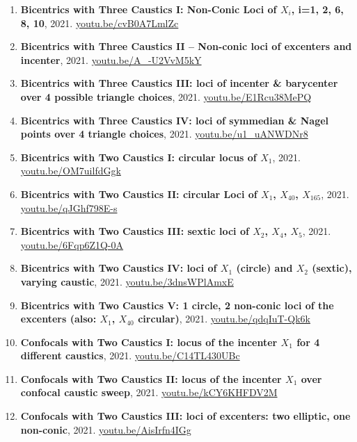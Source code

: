 \documentclass[12pt]{article}
\begin{document}
\begin{enumerate}[resume]
\item \textbf{Bicentrics with Three Caustics I: Non-Conic Loci of $X_i$, i=1, 2, 6, 8, 10}, 2021. \href{https://youtu.be/cvB0A7LmlZc}{\url{youtu.be/cvB0A7LmlZc}}
\item \textbf{Bicentrics with Three Caustics II -- Non-conic loci of excenters and  incenter}, 2021. \href{https://youtu.be/A_-U2VvM5kY}{\url{youtu.be/A\_-U2VvM5kY}}
\item \textbf{Bicentrics with Three Caustics III: loci of incenter \& barycenter over 4 possible triangle choices}, 2021. \href{https://youtu.be/E1Rcu38MePQ}{\url{youtu.be/E1Rcu38MePQ}}
\item \textbf{Bicentrics with Three Caustics IV: loci of symmedian \& Nagel points over 4 triangle choices}, 2021. \href{https://youtu.be/u1_uANWDNr8}{\url{youtu.be/u1\_uANWDNr8}}
\item \textbf{Bicentrics with Two Caustics I: circular locus of $X_{1}$}, 2021. \href{https://youtu.be/OM7uilfdGgk}{\url{youtu.be/OM7uilfdGgk}}
\item \textbf{Bicentrics with Two Caustics II: circular Loci of $X_{1}$, $X_{40}$, $X_{165}$}, 2021. \href{https://youtu.be/qJGhf798E-s}{\url{youtu.be/qJGhf798E-s}}
\item \textbf{Bicentrics with Two Caustics III: sextic loci of $X_{2}$, $X_{4}$, $X_{5}$}, 2021. \href{https://youtu.be/6Fqp6Z1Q-0A}{\url{youtu.be/6Fqp6Z1Q-0A}}
\item \textbf{Bicentrics with Two Caustics IV: loci of $X_{1}$ (circle) and $X_{2}$ (sextic), varying caustic}, 2021. \href{https://youtu.be/3dnsWPlAmxE}{\url{youtu.be/3dnsWPlAmxE}}
\item \textbf{Bicentrics with Two Caustics V: 1 circle, 2 non-conic loci of the excenters (also: $X_{1}$, $X_{40}$ circular)}, 2021. \href{https://youtu.be/qdqIuT-Qk6k}{\url{youtu.be/qdqIuT-Qk6k}}
\item \textbf{Confocals with Two Caustics I: locus of the incenter $X_{1}$ for 4 different caustics}, 2021. \href{https://youtu.be/C14TL430UBc}{\url{youtu.be/C14TL430UBc}}
\item \textbf{Confocals with Two Caustics II: locus of the incenter $X_{1}$ over confocal caustic sweep}, 2021. \href{https://youtu.be/kCY6KHFDV2M}{\url{youtu.be/kCY6KHFDV2M}}
\item \textbf{Confocals with Two Caustics III: loci of excenters: two elliptic, one non-conic}, 2021. \href{https://youtu.be/AisIrfn4IGg}{\url{youtu.be/AisIrfn4IGg}}

\end{enumerate}
\end{document}
